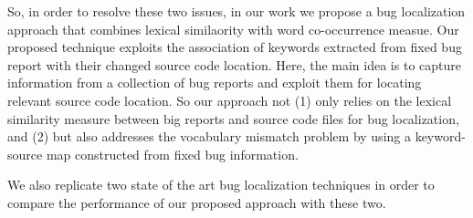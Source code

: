 \documentclass{sig-alternate}
\begin{document}
So, in order to resolve these two issues, in our work we propose a bug localization approach that combines lexical similaority with word co-occurrence measue. 
Our proposed technique exploits the association of keywords extracted from fixed bug report with their changed source code location. Here, the main idea is to capture information from a collection of bug reports and exploit them for locating relevant source code location.
 So our approach not (1) only relies on the lexical similarity measure between big reports and source code files for bug localization, and (2) but also addresses the vocabulary mismatch problem by using a keyword-source map constructed from fixed bug information.

We also replicate two state of the art bug localization techniques in order to compare the performance of our proposed approach with these two.
\end{document}
